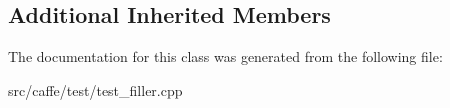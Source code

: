 \subsection*{Additional Inherited Members}


The documentation for this class was generated from the following file\+:\begin{DoxyCompactItemize}
\item 
src/caffe/test/test\+\_\+filler.\+cpp\end{DoxyCompactItemize}
